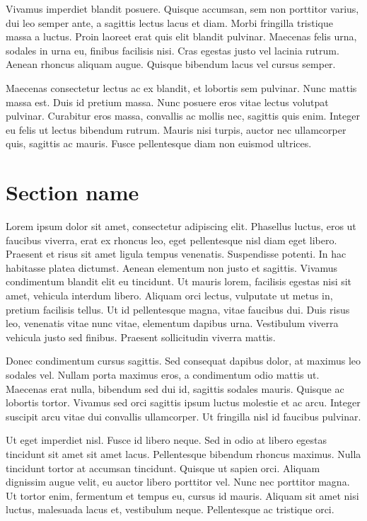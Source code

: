 Vivamus imperdiet blandit posuere. Quisque accumsan, sem non porttitor varius, dui leo semper ante, a sagittis lectus lacus et diam. Morbi fringilla tristique massa a luctus. Proin laoreet erat quis elit blandit pulvinar. Maecenas felis urna, sodales in urna eu, finibus facilisis nisi. Cras egestas justo vel lacinia rutrum. Aenean rhoncus aliquam augue. Quisque bibendum lacus vel cursus semper.

Maecenas consectetur lectus ac ex blandit, et lobortis sem pulvinar. Nunc mattis massa est. Duis id pretium massa. Nunc posuere eros vitae lectus volutpat pulvinar. Curabitur eros massa, convallis ac mollis nec, sagittis quis enim. Integer eu felis ut lectus bibendum rutrum. Mauris nisi turpis, auctor nec ullamcorper quis, sagittis ac mauris. Fusce pellentesque diam non euismod ultrices.

\section{Section name}
Lorem ipsum dolor sit amet, consectetur adipiscing elit. Phasellus luctus, eros ut faucibus viverra, erat ex rhoncus leo, eget pellentesque nisl diam eget libero. Praesent et risus sit amet ligula tempus venenatis. Suspendisse potenti. In hac habitasse platea dictumst. Aenean elementum non justo et sagittis. Vivamus condimentum blandit elit eu tincidunt. Ut mauris lorem, facilisis egestas nisi sit amet, vehicula interdum libero. Aliquam orci lectus, vulputate ut metus in, pretium facilisis tellus. Ut id pellentesque magna, vitae faucibus dui. Duis risus leo, venenatis vitae nunc vitae, elementum dapibus urna. Vestibulum viverra vehicula justo sed finibus. Praesent sollicitudin viverra mattis.

Donec condimentum cursus sagittis. Sed consequat dapibus dolor, at maximus leo sodales vel. Nullam porta maximus eros, a condimentum odio mattis ut. Maecenas erat nulla, bibendum sed dui id, sagittis sodales mauris. Quisque ac lobortis tortor. Vivamus sed orci sagittis ipsum luctus molestie et ac arcu. Integer suscipit arcu vitae dui convallis ullamcorper. Ut fringilla nisl id faucibus pulvinar.

Ut eget imperdiet nisl. Fusce id libero neque. Sed in odio at libero egestas tincidunt sit amet sit amet lacus. Pellentesque bibendum rhoncus maximus. Nulla tincidunt tortor at accumsan tincidunt. Quisque ut sapien orci. Aliquam dignissim augue velit, eu auctor libero porttitor vel. Nunc nec porttitor magna. Ut tortor enim, fermentum et tempus eu, cursus id mauris. Aliquam sit amet nisi luctus, malesuada lacus et, vestibulum neque. Pellentesque ac tristique orci.

